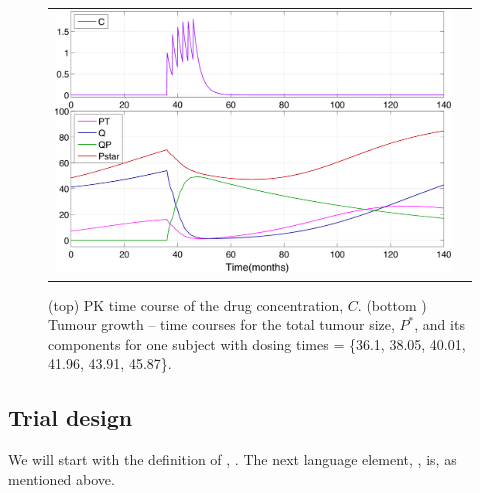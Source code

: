 \begin{figure}[htbp]
\centering
\begin{tabular}{cc}
\includegraphics[width=.6\textwidth]{pics/example5_timeCourse} 
\end{tabular}
\caption{ (top) PK time course of the drug concentration, $C$. (bottom ) Tumour 
growth -- time courses for the total tumour size, $P^*$, and its components
 for one subject with dosing times = \{36.1, 38.05, 40.01, 41.96, 43.91, 45.87\}.}
\label{fig:oneSubjectPKandTumourGrowth}
\end{figure}

\subsection{Trial design}
We will start with the definition of , . The next language element, 
, is, as mentioned above.

